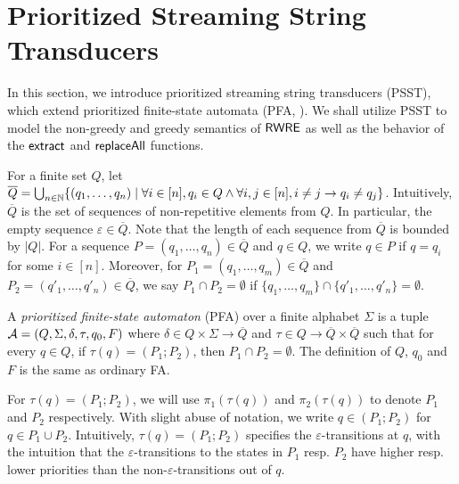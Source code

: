 
\section{Prioritized Streaming String Transducers}  \label{sect:psst}

In this section, we introduce prioritized streaming string transducers (PSST), which extend prioritized finite-state automata (PFA,  \cite{BM17}). We shall utilize PSST to model  the non-greedy and greedy semantics of ${\sf RWRE}$ as well as the behavior of the $\mathsf{extract}$ and $\mathsf{replaceAll}$ functions.

%
For a finite set $Q$, let $\overline{Q} = \bigcup_{n\in \mathbb{N}}\{ (q_1, \ldots, q_n) \mid \forall i \in [n], q_i \in Q \wedge \forall i,j \in[n], i \neq j \rightarrow q_i \neq q_j \}$. Intuitively, $\overline{Q}$ is the set of sequences of non-repetitive elements from $Q$. In particular, the empty sequence $\varepsilon \in \overline{Q}$. Note that the length of each sequence from $\overline{Q}$ is bounded by  $| Q |$. For a sequence $P = (q_1, \ldots, q_n) \in \overline{Q}$ and  $q \in Q$, we write $q \in P$ if  $q = q_i$ for some $i \in [n]$. Moreover, for $P_1 = (q_1, \ldots, q_m) \in \overline{Q}$ and $P_2 = (q'_1, \ldots, q'_n) \in \overline{Q}$, we say $P_1 \cap P_2 = \emptyset$ if $\{q_1, \ldots, q_m\} \cap \{q'_1, \ldots, q'_n\} = \emptyset$.


\begin{definition}\label{def-pfa}
  A \emph{prioritized finite-state automaton} (PFA) over a finite alphabet $\Sigma$ is a tuple $\mathcal{A}=(Q, \Sigma, \delta, \tau, q_0, F)$ where $\delta \in Q
  \times \Sigma \rightarrow \overline{Q}$ and $\tau \in Q \rightarrow \overline{Q} \times \overline{Q}$ such that for every $q \in Q$, if $\tau(q) = (P_1; P_2)$, then $P_1 \cap P_2 = \emptyset$. 
  The definition of $Q$, $q_0$ and $F$ is the same as ordinary FA.
\end{definition}
For $\tau(q) = (P_1; P_2)$, we will use $\pi_1(\tau(q))$ and $\pi_2(\tau(q))$ to denote $P_1$ and $P_2$ respectively.  With slight abuse of notation, we write $q\in (P_1; P_2)$ for $q\in P_1\cup P_2$. Intuitively, $\tau(q)=(P_1; P_2)$ specifies the $\varepsilon$-transitions at $q$, with the intuition that the $\varepsilon$-transitions to the states in $P_1$ resp. $P_2$ have higher resp. lower priorities than the non-$\varepsilon$-transitions out of $q$.
  
